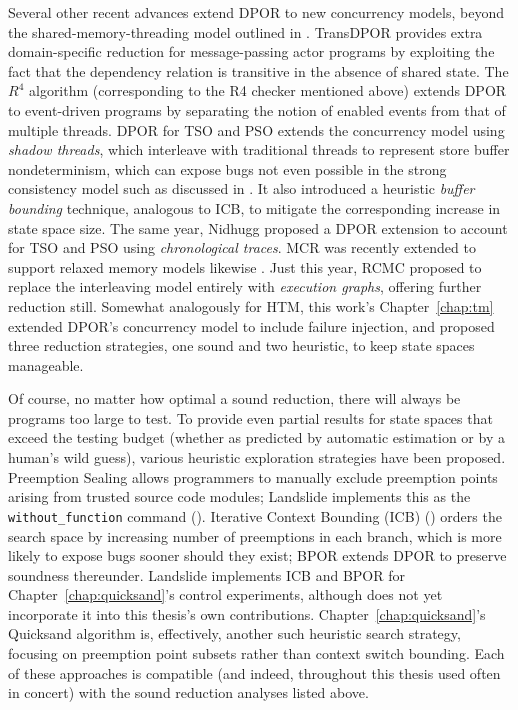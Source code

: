 Several other recent advances extend DPOR to new concurrency models,
beyond the shared-memory-threading model outlined in \sect{\ref{sec:landslide-dpor}}.
TransDPOR \cite{transdpor} provides extra domain-specific reduction for message-passing actor programs
by exploiting the fact that the dependency relation is transitive in the absence of shared state.
The $R^4$ algorithm \cite{r4} (corresponding to the R4 checker mentioned above)
extends DPOR to event-driven programs by separating the notion of enabled events from that of multiple threads.
DPOR for TSO and PSO \cite{tsopso}
extends the concurrency model
using {\em shadow threads}, which interleave with traditional threads to represent store buffer nondeterminism,
which can expose bugs not even possible in the strong consistency model
such as discussed in \sect{\ref{sec:tm-warpzone-relaxed}}.
It also introduced a heuristic {\em buffer bounding} technique, analogous to ICB,
to mitigate the corresponding increase in state space size.
The same year, Nidhugg \cite{nidhugg} proposed a DPOR extension to account for TSO and PSO
using {\em chronological traces}.
MCR was recently extended to support relaxed memory models likewise \cite{mcr-tsopso}.
Just this year, RCMC \cite{rcmc} proposed to replace the interleaving model entirely with {\em execution graphs},
offering further reduction still.
Somewhat analogously for HTM, this work's Chapter~\ref{chap:tm}
extended DPOR's concurrency model to include failure injection,
and proposed three reduction strategies, one sound and two heuristic,
to keep state spaces manageable.

Of course, no matter how optimal a sound reduction, there will always be programs too large to test.
To provide even partial results for state spaces that exceed the testing budget
(whether as predicted by automatic estimation \cite{estimation} or by a human's wild guess),
various heuristic exploration strategies have been proposed.
Preemption Sealing \cite{sealing} allows programmers to manually exclude preemption points
arising from trusted source code modules;
Landslide implements this as the {\tt without\_function} command (\sect{\ref{sec:landslide-pps}}).
Iterative Context Bounding (ICB) \cite{chess-icb} (\sect{\ref{sec:landslide-icb}})
orders the search space by increasing number of preemptions in each branch,
which is more likely to expose bugs sooner should they exist;
BPOR \cite{bpor} extends DPOR to preserve soundness
thereunder. %
Landslide implements ICB and BPOR for Chapter~\ref{chap:quicksand}'s control experiments,
although does not yet incorporate it into this thesis's own contributions.
Chapter~\ref{chap:quicksand}'s Quicksand algorithm is, effectively, another such heuristic search strategy,
focusing on preemption point subsets rather than context switch bounding.
Each of these approaches is compatible (and indeed, throughout this thesis used often in concert)
with the sound reduction analyses listed above.


